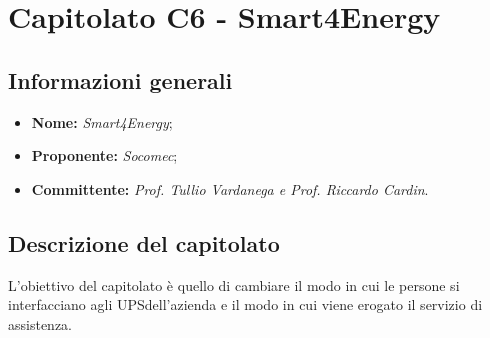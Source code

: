 \section{Capitolato C6 - Smart4Energy}\label{section:c6}

\subsection{Informazioni generali}
	\begin {itemize}
		\item \textbf{Nome:} \textit{Smart4Energy};
		\item \textbf{Proponente:} \textit{Socomec};
		\item \textbf{Committente:} \textit{Prof. Tullio Vardanega e Prof. Riccardo Cardin}.
	\end{itemize}

	\subsection{Descrizione del capitolato}
		L’obiettivo del capitolato è quello di cambiare il modo in cui le persone si interfacciano agli UPS\glo dell'azienda e il modo in cui viene erogato il servizio di assistenza.

